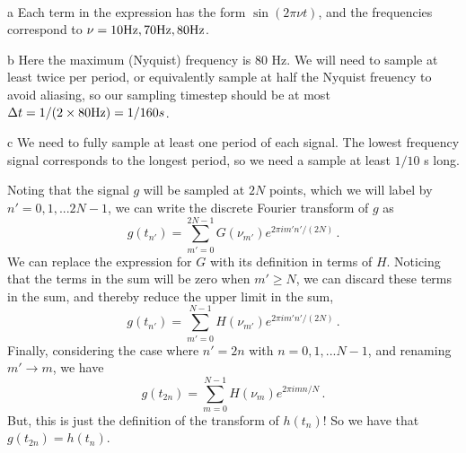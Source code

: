 \documentclass[]{homework}
\begin{document}

\begin{problem}{1}
  \,\\

  \begin{subproblem}{a}
    Each term in the expression has the form $\sin(2\pi \nu t)$, and
    the frequencies correspond to $\nu = 10 {\rm Hz}, 70 {\rm Hz}, 80 {\rm Hz}$.
  \end{subproblem}

  \begin{subproblem}{b}
    Here the maximum (Nyquist) frequency is 80 Hz. We will need to sample at least twice per
    period, or equivalently sample at half the Nyquist freuency to avoid aliasing, so our 
    sampling timestep should be at most $\Delta t = 1/(2 \times 80 {\rm Hz}) = 1/160 s$.
  \end{subproblem}

  \begin{subproblem}{c}
    We need to fully sample at least one period of each signal.
    The lowest frequency signal corresponds to the longest period, so
    we need a sample at least $1/10$ s long.
  \end{subproblem}

\end{problem}

\begin{problem}{2}
  Noting that the signal $g$ will be sampled at $2N$ points, which we will
  label by $n' = 0, 1, ... 2N-1$, we can write the discrete Fourier transform
  of $g$ as
  \[
    g(t_{n'}) = \sum_{m' = 0}^{2N-1} G(\nu_{m'}) e^{2\pi i m' n' / (2N)}\,.
  \]
  We can replace the expression for $G$ with its definition in terms of $H$.
  Noticing that the terms in the sum will be zero when $m' \ge N$, we can
  discard these terms in the sum, and thereby reduce the upper limit in the sum,
  \[
    g(t_{n'}) = \sum_{m' = 0}^{N-1} H(\nu_{m'}) e^{2\pi i m' n' / (2N)}\,.
  \]
  Finally, considering the case where $n' = 2n$ with $n = 0, 1, ... N-1$, 
  and renaming $m' \rightarrow m$, we have
  \[
    g(t_{2n}) = \sum_{m = 0}^{N-1} H(\nu_{m}) e^{2\pi i m n / N}\,.
  \]
  But, this is just the definition of the transform of $h(t_n)$! So we have
  that $g(t_{2n}) = h(t_n)$.

\end{problem}
\end{document}
